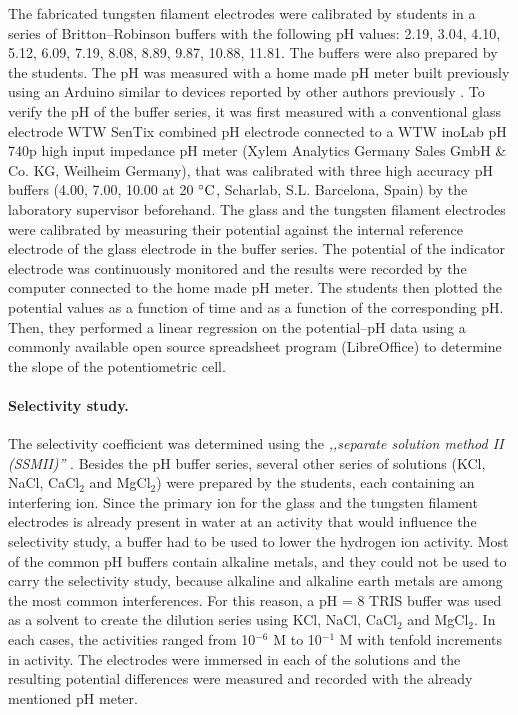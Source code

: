 \documentclass[manuscript=article, journal=jceda8]{achemso}
\begin{document}
The fabricated tungsten filament electrodes were calibrated by students in a series of Britton--Robinson buffers with the following pH values: 2.19, 3.04, 4.10, 5.12, 6.09, 7.19, 8.08, 8.89, 9.87, 10.88, 11.81. The buffers were also prepared by the students. The pH was measured with a home made pH meter built previously using an Arduino similar to devices reported by other authors previously \cite{jin2018open}. 
To verify the pH of the buffer series, it was first measured with a conventional glass electrode WTW SenTix combined pH electrode connected to a WTW inoLab pH 740p high input impedance pH meter (Xylem Analytics Germany Sales GmbH \& Co. KG, Weilheim Germany), that was calibrated with three high accuracy pH buffers (4.00, 7.00, 10.00 at 20 $\celsius$, Scharlab, S.L. Barcelona, Spain) by the laboratory supervisor beforehand.
The glass and the tungsten filament electrodes were calibrated by measuring their potential against the internal reference electrode of the glass electrode in the buffer series. The potential of the indicator electrode was continuously monitored and the results were recorded by the computer connected to the home made pH meter.
The students then plotted the potential values as a function of time and as a function of the corresponding pH. Then, they performed a linear regression on the potential--pH data using a commonly available open source spreadsheet program (LibreOffice) to determine the slope of the potentiometric cell. 


\paragraph{Selectivity study.}

The selectivity coefficient was determined using the \emph{,,separate solution method II (SSMII)''} \cite{buck1994recommendations}. Besides the pH buffer series, several other series of solutions (KCl, NaCl, CaCl$_2$ and MgCl$_2$) were prepared by the students, each containing an interfering ion. Since the primary ion for the glass and the tungsten filament electrodes is already present in water at an activity that would influence the selectivity study, a buffer had to be used to lower the hydrogen ion activity. Most of the common pH buffers contain alkaline metals, and they could not be used to carry the selectivity study, because alkaline and alkaline earth metals are among the most common interferences. For this reason, a pH = 8 TRIS buffer was used as a solvent to create the dilution series using KCl, NaCl, CaCl$_2$ and MgCl$_2$. In each cases, the activities ranged from 10$^{-6}$ M to 10$^{-1}$ M with tenfold increments in activity. The electrodes were immersed in each of the solutions and the resulting potential differences were measured and recorded with the already mentioned pH meter. 
\end{document}
